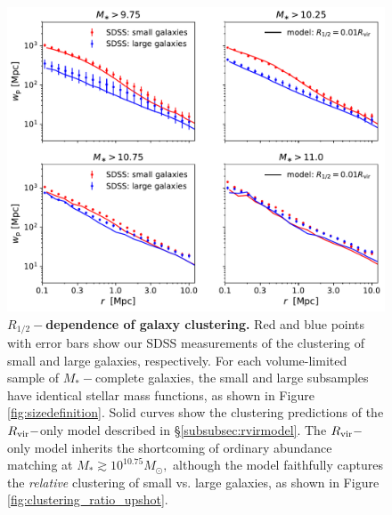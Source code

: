 \documentclass[usenatbib,usegraphicx,letterpaper]{mn2e}
\newcommand{\rhalf}{R_{1/2}}
\newcommand{\mstar}{M_{\ast}}
\newcommand{\rvir}{R_{\rm vir}}
\newcommand{\msun}{M_\odot}
\begin{document}
\begin{figure}
\centering
\includegraphics[width=12cm]{FIGS/rvir_only_wp_large_small_absolute.pdf}
\caption{
{\bf $\rhalf-$dependence of galaxy clustering.}
Red and blue points with error bars show our SDSS measurements of the clustering of small and large galaxies, respectively. For each volume-limited sample of $\mstar-$complete galaxies, the small and large subsamples have identical stellar mass functions, as shown in Figure \ref{fig:sizedefinition}. Solid curves show the clustering predictions of the $\rvir-$only model described in \S\ref{subsubsec:rvirmodel}. The $\rvir-$only model inherits the shortcoming of ordinary abundance matching at $\mstar\gtrsim10^{10.75}\msun,$ although the model faithfully captures the {\em relative} clustering of small vs. large galaxies, as shown in Figure \ref{fig:clustering_ratio_upshot}. 
}
\label{fig:rvir_only_clustering_absolute}
\end{figure}
\end{document}
